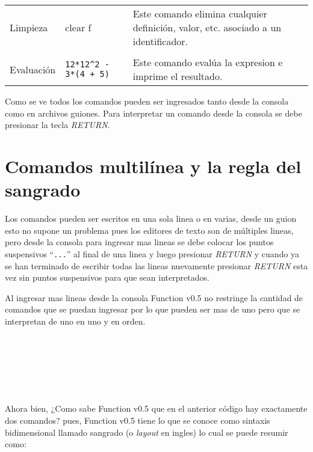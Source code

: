 \begin{longtable}[c]{lll}
         Limpieza & clear f &
         \begin{minipage}{7cm}
            Este comando elimina cualquier definición, valor, etc. asociado a un identificador.
         \end{minipage}\\ &&\\
         Evaluación & \texttt{12*12\^{}2 - 3*(4 + 5)} &
         \begin{minipage}{7cm}
            Este comando evalúa la expresion e imprime el resultado.
         \end{minipage}\\
      \end{longtable}
      
      Como se ve todos los comandos pueden ser ingresados tanto desde la consola como en archivos guiones. Para interpretar un comando desde la consola se debe presionar la tecla {\it RETURN}.
      
   \section{Comandos multilínea y la regla del sangrado}
      Los comandos pueden ser escritos en una sola linea o en varias, desde un guion esto no supone un problema pues los editores de texto son de múltiples lineas, pero desde la consola para ingresar mas lineas se debe colocar los puntos suspensivos ``\texttt{...}'' al final de una linea y luego presionar {\it RETURN} y cuando ya se han terminado de escribir todas las lineas nuevamente presionar {\it RETURN} esta vez sin puntos suspensivos para que sean interpretados.
   
      Al ingresar mas lineas desde la consola Function v0.5 no restringe la cantidad de comandos que se puedan ingresar por lo que pueden ser mas de uno pero que se interpretan de uno en uno y en orden.
      
      \begin{fxcode}
         \\
         \\
         \\
         \\
         \\
      \end{fxcode}
      
      Ahora bien, ¿Como sabe Function v0.5 que en el anterior código hay exactamente dos comandos? pues, Function v0.5 tiene lo que se conoce como sintaxis bidimensional llamado sangrado (o {\it layout} en ingles) lo cual se puede resumir como:
      
